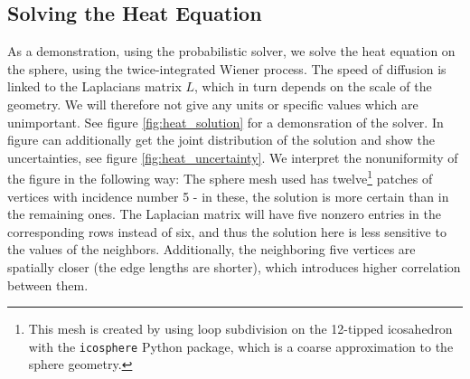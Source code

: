 \subsection*{Solving the Heat Equation}
As a demonstration, using the probabilistic solver, we solve the heat equation on the sphere, using the twice-integrated Wiener process. The speed of diffusion is linked to the Laplacians matrix $L$, which in turn depends on the scale of the geometry. We will therefore not give any units or specific values which are unimportant. See figure \ref{fig:heat_solution} for a demonsration of the solver. In figure can additionally get the joint distribution of the solution and show the uncertainties, see figure \ref{fig:heat_uncertainty}. We interpret the nonuniformity of the figure in the following way: The sphere mesh used has twelve\footnote{This mesh is created by using loop subdivision on the 12-tipped icosahedron with the \texttt{icosphere} Python package, which is a coarse approximation to the sphere geometry.} patches of vertices with incidence number 5 - in these, the solution is more certain than in the remaining ones. The Laplacian matrix will have five nonzero entries in the corresponding rows instead of six, and thus the solution here is less sensitive to the values of the neighbors. Additionally, the neighboring five vertices are spatially closer (the edge lengths are shorter), which introduces higher correlation between them.
